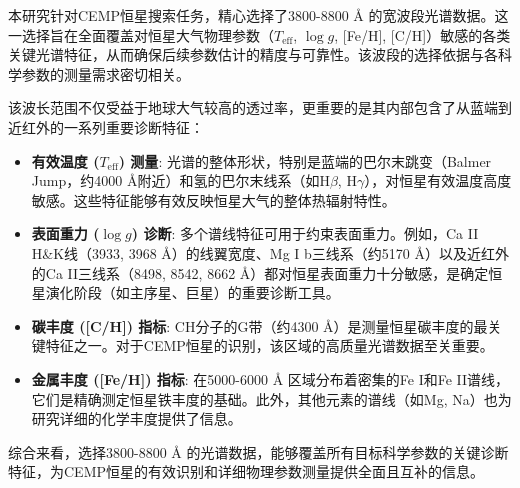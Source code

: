 本研究针对CEMP恒星搜索任务，精心选择了3800-8800 Å 的宽波段光谱数据。这一选择旨在全面覆盖对恒星大气物理参数（$T_{\text{eff}}$, $\log g$, [Fe/H], [C/H]）敏感的各类关键光谱特征，从而确保后续参数估计的精度与可靠性。该波段的选择依据与各科学参数的测量需求密切相关。

该波长范围不仅受益于地球大气较高的透过率，更重要的是其内部包含了从蓝端到近红外的一系列重要诊断特征：

\begin{itemize}
    \item \textbf{有效温度 ($T_{\text{eff}}$) 测量}: 光谱的整体形状，特别是蓝端的巴尔末跳变（Balmer Jump，约4000 Å附近）和氢的巴尔末线系（如H$\beta$, H$\gamma$），对恒星有效温度高度敏感。这些特征能够有效反映恒星大气的整体热辐射特性。
    \item \textbf{表面重力 ($\log g$) 诊断}: 多个谱线特征可用于约束表面重力。例如，Ca II H\&K线（3933, 3968 Å）的线翼宽度、Mg I b三线系（约5170 Å）以及近红外的Ca II三线系（8498, 8542, 8662 Å）都对恒星表面重力十分敏感，是确定恒星演化阶段（如主序星、巨星）的重要诊断工具。
    \item \textbf{碳丰度 ([C/H]) 指标}: CH分子的G带（约4300 Å）是测量恒星碳丰度的最关键特征之一。对于CEMP恒星的识别，该区域的高质量光谱数据至关重要。
    \item \textbf{金属丰度 ([Fe/H]) 指标}: 在5000-6000 Å 区域分布着密集的Fe I和Fe II谱线，它们是精确测定恒星铁丰度的基础。此外，其他元素的谱线（如Mg, Na）也为研究详细的化学丰度提供了信息。
\end{itemize}

综合来看，选择3800-8800 Å 的光谱数据，能够覆盖所有目标科学参数的关键诊断特征，为CEMP恒星的有效识别和详细物理参数测量提供全面且互补的信息。
